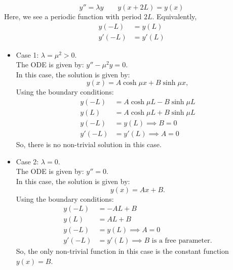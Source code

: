 \begin{eg}\label{eg:bvpmotiv2}
	\[
	y'' = \lambda y \qquad y(x+2L) = y(x)
	\]
	Here, we see a periodic function with period $2L$. Equivalently,
	\begin{align*}
		y(-L) &= y(L) \\
		y'(-L) &= y'(L)
	\end{align*}
	\begin{itemize}
		\item Case 1: $\lambda = \mu^2 > 0$.\\
		The ODE is given by: $y'' - \mu^2 y = 0$.\\
		In this case, the solution is given by:
		\[
		y(x) = A \cosh{\mu x} + B \sinh{\mu x},
		\]
		Using the boundary conditions:
		\begin{align*}
			y(-L) &= A \cosh{\mu L} - B \sinh{\mu L} \\
			y(L) &= A \cosh{\mu L} + B \sinh{\mu L} \\
			y(-L) &= y(L) \implies B = 0 \\
			y'(-L) &= y'(L) \implies A = 0 
		\end{align*}
		So, there is no non-trivial solution in this case.
		
		\item Case 2: $\lambda = 0$.\\
		The ODE is given by: $y''= 0$.\\
		In this case, the solution is given by:
		\[
		y(x) = Ax + B.
		\]
		Using the boundary conditions:
		\begin{align*}
			y(-L) &= -AL + B\\
			y(L) &= AL + B \\
			y(-L) &= y(L) \implies A = 0 \\
			y'(-L) &= y'(L) \implies B \text{ is a free parameter.}
		\end{align*}
		So, the only non-trivial function in this case is the constant function $y(x)=B$.
		

\end{itemize}
\end{eg}
